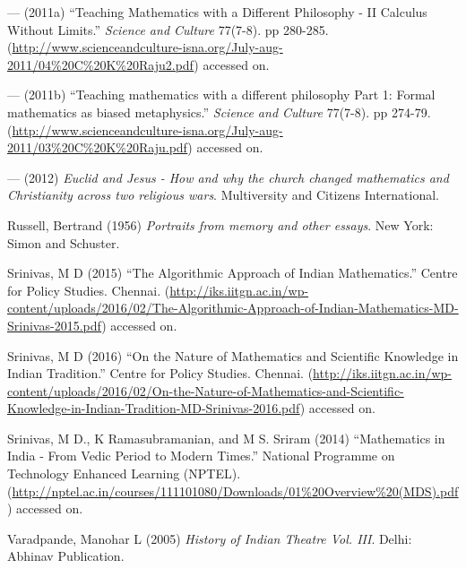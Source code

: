 \begin{thebibliography}{99}
--- (2011a) ``Teaching Mathematics with a Different Philosophy - II Calculus Without Limits.'' {\sl Science and Culture} 77(7-8). pp 280-285. (\url{http://www.scienceandculture-isna.org/July-aug-2011/04%20C%20K%20Raju2.pdf}) accessed on.

--- (2011b) ``Teaching mathematics with a different philosophy Part 1: Formal mathematics as biased metaphysics.'' {\sl Science and Culture} 77(7-8). pp 274-79. (\url{http://www.scienceandculture-isna.org/July-aug-2011/03%20C%20K%20Raju.pdf}) accessed on.

--- (2012) {\sl Euclid and Jesus - How and why the church changed mathematics and Christianity across two religious wars}. Multiversity and Citizens International.

Russell, Bertrand (1956) {\sl Portraits from memory and other essays}. New York: Simon and Schuster.

Srinivas, M D (2015) ``The Algorithmic Approach of Indian Mathematics.'' Centre for Policy Studies. Chennai. (\url{http://iks.iitgn.ac.in/wp-content/uploads/2016/02/The-Algorithmic-Approach-of-Indian-Mathematics-MD-Srinivas-2015.pdf}) accessed on.

Srinivas, M D (2016) ``On the Nature of Mathematics and Scientific Knowledge in Indian Tradition.'' Centre for Policy Studies. Chennai. (\url{http://iks.iitgn.ac.in/wp-content/uploads/2016/02/On-the-Nature-of-Mathematics-and-Scientific-Knowledge-in-Indian-Tradition-MD-Srinivas-2016.pdf}) accessed on.

Srinivas, M D., K Ramasubramanian, and M S. Sriram (2014) ``Mathematics in India - From Vedic Period to Modern Times.'' National Programme on Technology Enhanced Learning (NPTEL). (\url{http://nptel.ac.in/courses/111101080/Downloads/01%20Overview%20(MDS).pdf}) accessed on.

Varadpande, Manohar L (2005) {\sl History of Indian Theatre Vol. III}. Delhi: Abhinav Publication.
\end{thebibliography}

\theendnotes
